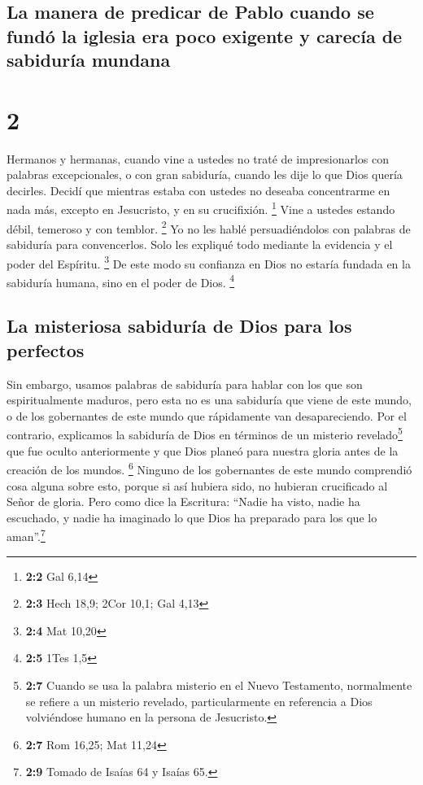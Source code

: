 \hypertarget{la-manera-de-predicar-de-pablo-cuando-se-funduxf3-la-iglesia-era-poco-exigente-y-carecuxeda-de-sabiduruxeda-mundana}{%
\subsection{La manera de predicar de Pablo cuando se fundó la iglesia
era poco exigente y carecía de sabiduría
mundana}\label{la-manera-de-predicar-de-pablo-cuando-se-funduxf3-la-iglesia-era-poco-exigente-y-carecuxeda-de-sabiduruxeda-mundana}}

\hypertarget{section-1}{%
\section{2}\label{section-1}}

 Hermanos y hermanas, cuando vine a ustedes no traté de
impresionarlos con palabras excepcionales, o con gran sabiduría, cuando
les dije lo que Dios quería decirles.  Decidí que mientras
estaba con ustedes no deseaba concentrarme en nada más, excepto en
Jesucristo, y en su crucifixión. \footnote{\textbf{2:2} Gal 6,14}
 Vine a ustedes estando débil, temeroso y con temblor.
\footnote{\textbf{2:3} Hech 18,9; 2Cor 10,1; Gal 4,13}  Yo
no les hablé persuadiéndolos con palabras de sabiduría para
convencerlos. Solo les expliqué todo mediante la evidencia y el poder
del Espíritu. \footnote{\textbf{2:4} Mat 10,20}  De este
modo su confianza en Dios no estaría fundada en la sabiduría humana,
sino en el poder de Dios. \footnote{\textbf{2:5} 1Tes 1,5}

\hypertarget{la-misteriosa-sabiduruxeda-de-dios-para-los-perfectos}{%
\subsection{La misteriosa sabiduría de Dios para los
perfectos}\label{la-misteriosa-sabiduruxeda-de-dios-para-los-perfectos}}

 Sin embargo, usamos palabras de sabiduría para hablar con
los que son espiritualmente maduros, pero esta no es una sabiduría que
viene de este mundo, o de los gobernantes de este mundo que rápidamente
van desapareciendo.  Por el contrario, explicamos la
sabiduría de Dios en términos de un misterio revelado\footnote{\textbf{2:7}
  Cuando se usa la palabra misterio en el Nuevo Testamento, normalmente
  se refiere a un misterio revelado, particularmente en referencia a
  Dios volviéndose humano en la persona de Jesucristo.} que fue oculto
anteriormente y que Dios planeó para nuestra gloria antes de la creación
de los mundos. \footnote{\textbf{2:7} Rom 16,25; Mat 11,24}
 Ninguno de los gobernantes de este mundo comprendió cosa
alguna sobre esto, porque si así hubiera sido, no hubieran crucificado
al Señor de gloria.  Pero como dice la Escritura: ``Nadie
ha visto, nadie ha escuchado, y nadie ha imaginado lo que Dios ha
preparado para los que lo aman''.\footnote{\textbf{2:9} Tomado de Isaías
  64 y Isaías 65.}

